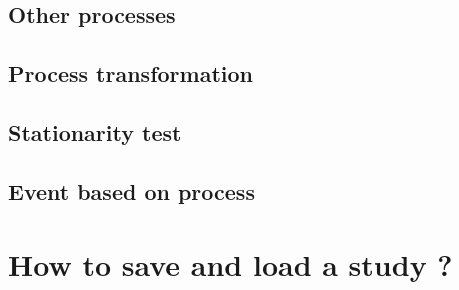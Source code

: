 
\newpage 
\newpage 
\newpage 
\newpage 


\newpage 
\newpage 
\newpage 

\newpage 

\newpage 



\newpage \subsection{Other processes}


\newpage 
\newpage 


\newpage \subsection{Process transformation}


\newpage 


\newpage \subsection{Stationarity test}



\newpage \subsection{Event based on process}



\newpage 


\clearpage \newpage \section{How to save and load a study ?}


